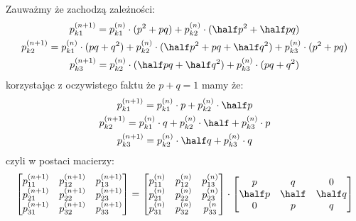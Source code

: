 \documentclass[11pt]{scrartcl}
\begin{document}
    Zauważmy że zachodzą zależności:
    \begin{gather*}
        p_{k1}^{(n+1)} = p_{k1}^{(n)} \cdot (p^2 + pq) + 
            p_{k2}^{(n)} \cdot (\half p^2 + \half pq) \\
        p_{k2}^{(n+1)} = p_{k1}^{(n)} \cdot (pq + q^2) +
            p_{k2}^{(n)} \cdot (\half p^2 + pq + \half q^2) +
            p_{k3}^{(n)} \cdot (p^2 + pq) \\
        p_{k3}^{(n+1)} = p_{k2}^{(n)} \cdot (\half pq + \half q^2) +
            p_{k3}^{(n)} \cdot (pq + q^2)
    \end{gather*}
    korzystając z oczywistego faktu że $p + q = 1$ mamy że:
    \begin{gather*}
        p_{k1}^{(n+1)} = p_{k1}^{(n)} \cdot p + 
            p_{k2}^{(n)} \cdot \half p  \\
        p_{k2}^{(n+1)} = p_{k1}^{(n)} \cdot q +
            p_{k2}^{(n)} \cdot \half +
            p_{k3}^{(n)} \cdot p \\
        p_{k3}^{(n+1)} = p_{k2}^{(n)} \cdot \half q +
            p_{k3}^{(n)} \cdot q
    \end{gather*}
    czyli w postaci macierzy:
    \begin{gather*}
        \begin{bmatrix}
            p_{11}^{(n+1)} & p_{12}^{(n+1)} & p_{13}^{(n+1)} \\
            p_{21}^{(n+1)} & p_{22}^{(n+1)} & p_{23}^{(n+1)} \\
            p_{31}^{(n+1)} & p_{32}^{(n+1)} & p_{33}^{(n+1)}
        \end{bmatrix} =
        \begin{bmatrix}
            p_{11}^{(n)} & p_{12}^{(n)} & p_{13}^{(n)} \\
            p_{21}^{(n)} & p_{22}^{(n)} & p_{23}^{(n)} \\
            p_{31}^{(n)} & p_{32}^{(n)} & p_{33}^{(n}
        \end{bmatrix}
        \cdot 
        \begin{bmatrix}
            p       & q     & 0       \\
            \half p & \half & \half q \\
            0       & p     & q
        \end{bmatrix}
    \end{gather*}
\end{document}
